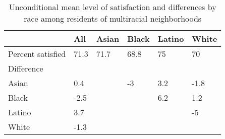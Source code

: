 % 
\begin{sidewaystable}[ht]
\centering
\caption{Unconditional mean level of satisfaction and differences by race among residents of multiracial neighborhoods} 
\label{tab:descwn}
\begin{tabular}{lR{4em}R{4em}R{4em}R{4em}R{4em}}
  \toprule
 & All & Asian & Black & Latino & White \\ 
  \midrule
Percent satisfied & 71.3 & 71.7 & 68.8 & 75 & 70 \\ 
  Difference &  &  &  &  &  \\ 
  Asian & 0.4 &  & -3 & 3.2 & -1.8 \\ 
  Black & -2.5 &  &  & 6.2 & 1.2 \\ 
  Latino & 3.7 &  &  &  & -5 \\ 
  White & -1.3 &  &  &  &  \\ 
   \bottomrule
\end{tabular}
\end{sidewaystable}
